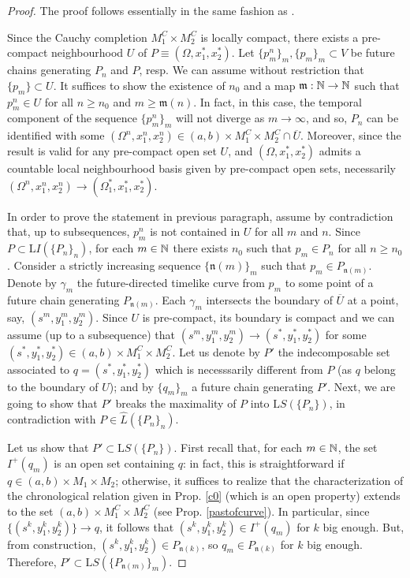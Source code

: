 \begin{proof}
 The proof follows essentially in the same fashion as \cite[Prop. 5.24]{FHSBuseman}.

  Since the Cauchy completion $M_1^C\times M_2^C$ is locally compact, there exists a pre-compact neighbourhood $U$ of $P\equiv(\Omega,x_1^*,x_2^*)$. Let $\{p^n_m\}_m,\{p_m\}_m\subset V$ be future chains generating $P_n$ and $P$, resp. We can assume without restriction that $\{p_m\}\subset U$.
  It suffices to show the existence of $n_0$ and a map $\mathfrak{m}:{\mathbb N}\rightarrow{\mathbb N}$ such that $p_m^n\in U$ for all $n\geq n_0$ and $m\geq \mathfrak{m}(n)$. In fact, in this case, the temporal component of the sequence $\{p^n_m\}_m$ will not diverge as $m\rightarrow\infty$, and so, $P_n$ can be identified with some $(\Omega^n,x_1^n,x_2^n)\in (a,b) \times M_1^C\times M_2^C\cap\overline{U}$. Moreover, since the result is valid for any pre-compact open set $U$, and $(\Omega,x_1^*,x_2^*)$ admits a countable local neighbourhood basis given by pre-compact open sets, necessarily $(\Omega^n,x_1^n,x_2^n)\rightarrow (\Omega_1^*,x_1^*,x_2^*)$.

In order to prove the statement in previous paragraph, assume by contradiction that, up to subsequences, $p^n_m$ is not contained in $U$ for all $m$ and $n$. Since $P\subset {\mathrm LI}(\{P_n\}_n)$, for each $m\in {\mathbb N}$ there exists $n_0$ such that $p_m\in P_n$ for all $n\geq n_0$. Consider a strictly increasing sequence $\{\mathfrak{n}(m)\}_m$ such that $p_m\in P_{\mathfrak{n}(m)}$. Denote by  $\gamma_m$ the future-directed timelike curve from $p_m$ to some point of a future chain generating $P_{\mathfrak{n}(m)}$. Each $\gamma_m $ intersects the boundary of $\overline{U}$ at a point, say, $(s^m,y_1^m,y_2^m)$. Since $U$ is pre-compact, its boundary is compact and we can assume (up to a subsequence) that $(s^m,y_1^m,y_2^m)\rightarrow (s^*,y^*_1,y^*_2)$ for some $(s^*,y^*_1,y^*_2)\in (a,b) \times M_1^C\times M_2^C$. Let us denote by $P'$ the indecomposable set associated to $q=(s^*,y^*_1,y^*_2)$ which is necesssarily different from $P$ (as $q$ belong to the boundary of $U$); and by $\{q_m\}_m$ a future chain generating $P'$. Next, we are going to show that $P'$ breaks the maximality of $P$ into ${\mathrm LS}(\{P_n\})$, in contradiction with $P\in \hat{L}(\{P_n\}_n)$.

Let us show that $P'\subset {\mathrm LS}(\{P_n\})$. First recall that,  for each $m\in {\mathbb N}$, the set $I^+(q_m)$ is an open set containing $q$:
in fact, this is straightforward if $q\in (a,b)\times M_1\times M_2$; otherwise, it suffices to realize that the characterization of the chronological relation given in Prop. \ref{c0} (which is an open property) extends to the set $(a,b)\times M_1^C\times M_2^C$ (see Prop. \ref{pastofcurve}).
In particular, since $\{(s^k,y_1^k,y_2^k)\}\rightarrow q$, it follows that $(s^k,y_1^k,y_2^k)\in I^+(q_m)$ for $k$ big enough. But, from construction, $(s^k,y_1^k,y_2^k)\in P_{\mathfrak{n}(k)}$, so $q_m\in P_{\mathfrak{n}(k)}$ for $k$ big enough. Therefore, $P'\subset {\mathrm LS}(\{P_{\mathfrak{n}(m)}\}_m)$.


\end{proof}
